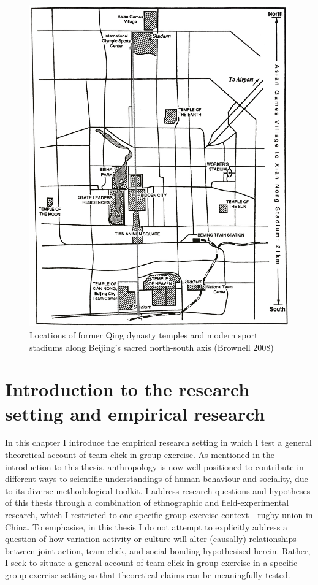 \begin{CJK}{UTF8}{gbsn}
\begin{figure}[htbp]
    \centering
  \includegraphics[scale =.1]{images/beijingTemplesXNT.png}
  \caption{Locations of former Qing dynasty temples and modern sport stadiums along Beijing's sacred north-south axis (Brownell 2008)}
  \label{fig:beijingTemplesXNT}
\end{figure}



\section{Introduction to the research setting and empirical research}

In this chapter I introduce the empirical research setting in which I test a general theoretical account of team click in group exercise.  As mentioned in the introduction to this thesis, anthropology is now well positioned to contribute in different ways to scientific understandings of human behaviour and sociality, due to its diverse methodological toolkit.  I address research questions and hypotheses of this thesis through a combination of ethnographic and field-experimental research, which I restricted to one specific group exercise context—rugby union in China.  To emphasise, in this thesis I do not attempt to explicitly address a question of how variation activity or culture will alter (causally) relationships between joint action, team click, and social bonding hypothesised herein.  Rather, I seek to situate a general account of team click in group exercise in a specific group exercise setting so that theoretical claims can be meaningfully tested.


\end{CJK}
